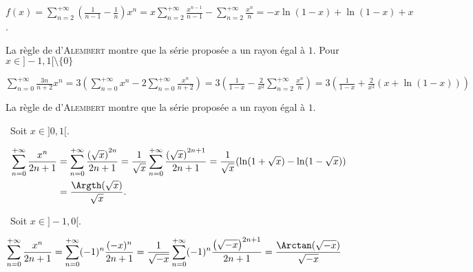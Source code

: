 {{\begin{center}
$f(x) =\sum_{n=2}^{+\infty}\left(\frac{1}{n-1}-\frac{1}{n}\right)x^n =x\sum_{n=2}^{+\infty}\frac{x^{n-1}}{n-1}-\sum_{n=2}^{+\infty}\frac{x^n}{n}=-x\ln(1-x) +\ln(1-x) + x$.
\end{center}

\begin{center}
\shadowbox{
$\forall x\in]-1,1[$, $\sum_{n=2}^{+\infty}\frac{x^n}{n(n-1)}=-x\ln(1-x) +\ln(1-x) + x$.
}
\end{center}
La règle de d'\textsc{Alembert} montre que la série proposée a un rayon égal à $1$.
Pour $x\in]-1,1[\setminus\{0\}$

\begin{center}
$\sum_{n=0}^{+\infty}\frac{3n}{n+2}x^n =3\left(\sum_{n=0}^{+\infty}x^n - 2\sum_{n=0}^{+\infty}\frac{x^n}{n+2}\right) = 3\left(\frac{1}{1-x}- \frac{2}{x^2}\sum_{n=2}^{+\infty}\frac{x^n}{n}\right) = 3\left(\frac{1}{1-x}+\frac{2}{x^2}(x+\ln(1-x))\right)$
\end{center}

\begin{center}
\shadowbox{
$\forall x\in]-1,1[$, $\sum_{n=0}^{+\infty}\frac{3n}{n+2}x^n=\left\{
\begin{array}{l}3\left(\frac{1}{1-x}+\frac{2}{x^2}(x+\ln(1-x))\right)\;\text{si}\;x\in]-1,1[\setminus\{0\}\\
\rule{0mm}{4mm}0\;\text{si}\;x=0
\end{array}
\right.$.
}
\end{center}
La règle de d'\textsc{Alembert} montre que la série proposée a un rayon égal à $1$.

\textbullet~Soit $x\in]0,1[$.

\begin{align*}\ensuremath
\sum_{n=0}^{+\infty}\frac{x^n}{2n+1}&=\sum_{n=0}^{+\infty}\frac{\left(\sqrt{x}\right)^{2n}}{2n+1}=\frac{1}{\sqrt{x}}\sum_{n=0}^{+\infty}\frac{\left(\sqrt{x}\right)^{2n+1}}{2n+1}=\frac{1}{\sqrt{x}}(\ln(1+\sqrt{x}) -\ln(1-\sqrt{x}))\\
 &=\frac{\Argth(\sqrt{x})}{\sqrt{x}}.
\end{align*}	

\textbullet~Soit $x\in]-1,0[$.

\begin{align*}\ensuremath
\sum_{n=0}^{+\infty}\frac{x^n}{2n+1}&=\sum_{n=0}^{+\infty}(-1)^n\frac{(-x)^n}{2n+1}=\frac{1}{\sqrt{-x}}\sum_{n=0}^{+\infty}(-1)^n\frac{\left(\sqrt{-x}\right)^{2n+1}}{2n+1}=\frac{\Arctan(\sqrt{-x})}{\sqrt{-x}}
\end{align*}

}}
